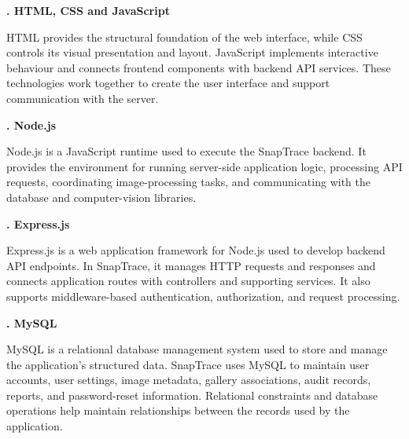 \vspace{0.4cm}
{ \noindent \bfseries \fontsize{14pt}{15pt}. HTML, CSS and JavaScript}

\vspace{0.2cm}
\par \noindent HTML provides the structural foundation of the web interface, while CSS controls its visual presentation and layout. JavaScript implements interactive behaviour and connects frontend components with backend API services. These technologies work together to create the user interface and support communication with the server.

\vspace{0.4cm}
{ \noindent \bfseries \fontsize{14pt}{15pt}. Node.js
    \par}

\vspace{0.2cm}
\par \noindent Node.js is a JavaScript runtime used to execute the SnapTrace backend. It provides the environment for running server-side application logic, processing API requests, coordinating image-processing tasks, and communicating with the database and computer-vision libraries.

\clearpage
\vspace*{0.5cm}
{ \noindent \bfseries \fontsize{14pt}{15pt}. Express.js
    \par}

\vspace{0.2cm}
\par \noindent Express.js is a web application framework for Node.js used to develop backend API endpoints. In SnapTrace, it manages HTTP requests and responses and connects application routes with controllers and supporting services. It also supports middleware-based authentication, authorization, and request processing.

\vspace{0.4cm}
{ \noindent \bfseries \fontsize{14pt}{15pt}. MySQL
    \par}

\vspace{0.2cm}
\par \noindent MySQL is a relational database management system used to store and manage the application's structured data. SnapTrace uses MySQL to maintain user accounts, user settings, image metadata, gallery associations, audit records, reports, and password-reset information. Relational constraints and database operations help maintain relationships between the records used by the application.

